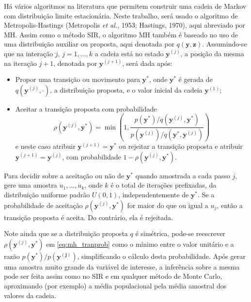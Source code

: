Há vários algoritmos na literatura que permitem construir uma cadeia de Markov com distribuição limite estacionária. Neste trabalho, será usado o algoritmo de Metropolis-Hastings (Metropolis \textit{et al.}, 1953\cite{Metrop1953}; Hastings, 1970\cite{Hastin1970}), aqui abreviado por MH. Assim como o método SIR, o algoritmo MH também é baseado no uso de uma distribuição auxiliar ou proposta, aqui denotada por $q(\bm{y}, \bm{z})$. Assumindo-se que na interação $j$, $j = 1, \ldots, k$ a cadeia está no estado $\bm{y}^{(j)}$, a posição da mesma na iteração $j + 1$, denotada por $\bm{y}^{(j + 1)}$, será dada após:
\begin{itemize}
	\item Propor uma transição ou movimento para $\bm{y}^*$, onde $\bm{y}^*$ é gerada de $q(\bm{y}^{(j)}, \cdot)$, a distribuição proposta, e o valor inicial da cadeia $\mathbf{y}^{(1)}$;
	\item Aceitar a transição proposta com probabilidade
	\begin{equation}\label{eq:mh_tranprob}
	\rho(\bm{y}^{(j)}, \bm{y}^*) = \min\left(1, \dfrac{p(\bm{y}^*) / q(\bm{y}^{(j)}, \bm{y}^*)}{p(\bm{y}^{(j)}) / q(\bm{y}^*, \bm{y}^{(j)})}\right)
	\end{equation}
	e neste caso atribuir $\bm{y}^{(j + 1)} = \bm{y}^*$ ou rejeitar a transição proposta e atribuir $\bm{y}^{(j + 1)} = \bm{y}^{(j)}$, com probabilidade $1 - \rho(\bm{y}^{(j)}, \bm{y}^*)$.
\end{itemize}

Para decidir sobre a aceitação ou não de $\bm{y}^*$ quando amostrada a cada passo $j$, gere uma amostra $u_1, \ldots, u_k$, onde $k$ é o total de iterações prefixadas, da distribuição uniforme padrão $U(0,1)$, independentemente de $\bm{y}^*$. Se a probabilidade de aceitação $\rho(\bm{y}^{(j)}, \bm{y}^*)$ for maior do que ou igual a $u_j$, então a transição proposta é aceita. Do contrário, ela é rejeitada.

Note ainda que se a distribuição proposta $q$ é simétrica, pode-se reescrever $\rho(\bm{y}^{(j)}, \bm{y}^*)$ em \eqref{eq:mh_tranprob} como o mínimo entre o valor unitário e a razão $p(\bm{y}^*)/p(\bm{y^{(j)}})$, simplificando o cálculo desta probabilidade. Após gerar uma amostra muito grande da variável de interesse, a inferência sobre a mesma pode ser feita assim como no SIR e em qualquer método de Monte Carlo, aproximando (por exemplo) a média populacional pela média amostral dos valores da cadeia.

